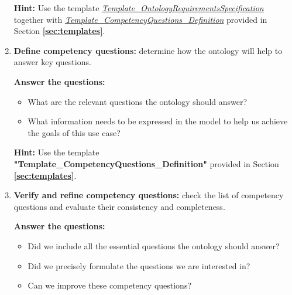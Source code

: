 \documentclass{guideline/sty/rapport}
\begin{document}
\begin{enumerate}
\begin{mdframed}[backgroundcolor=officegreen!8, linecolor=officegreen]
    \begin{minipage}[t]{1\linewidth}
    \textbf{Hint:}
      Use the template \href{https://docs.google.com/document/d/1mkHccxvvGbj3omXubZ_EbM_l7m8LfalJ/edit}{\textit{Template\_OntologyRequirementsSpecification}} \\ together with \href{https://docs.google.com/spreadsheets/d/1UwT7DnW3pIkDKmfn1jgONsp2BbiQZ4mJeeg0lOBV0DQ/edit#gid=0}{\textit{Template\_CompetencyQuestions\_Definition}} provided in Section \textbf{\ref{sec:templates}}.
    \end{minipage}
\end{mdframed}


\item \textcolor{sapphire}{\textbf{Define competency questions:}} determine how the ontology will help to answer key questions. \label{step3}

\textbf{Answer the questions:} 
\begin{itemize}
    \item What are the relevant questions the ontology should answer? 
    \item What information needs to be expressed in the model to help us achieve the goals of this use case?
\end{itemize}

\begin{mdframed}[backgroundcolor=officegreen!8, linecolor=officegreen]
    \begin{minipage}[t]{1\linewidth}
    \textbf{Hint:}
      Use the template 
      \textbf{"Template\_CompetencyQuestions\_Definition"} provided in Section \textbf{\ref{sec:templates}}.
    \end{minipage}
\end{mdframed}

\item \textcolor{sapphire}{\textbf{Verify and refine competency questions:}} check the list of competency questions and evaluate their consistency and completeness. \label{step4}

\textbf{Answer the questions:} 
\begin{itemize}
    \item Did we include all the essential questions the ontology should answer? 
    \item Did we precisely formulate the questions we are interested in? 
    \item Can we improve these competency questions?
\end{itemize}


\end{enumerate}
\end{document}
